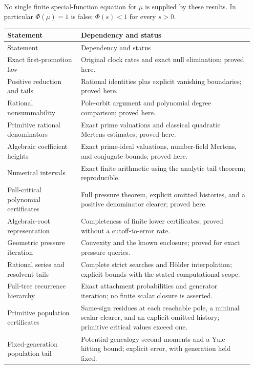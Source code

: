 \documentclass[11pt]{article}
\theoremstyle{remark}
\begin{document}
No single finite special-function equation for $\mu$ is supplied by
these results. In particular $\Phi(\mu)=1$ is false:
$\Phi(s)<1$ for every $s>0$.

{\small
\begin{longtable}{p{}p{}}
\toprule
Statement & Dependency and status\\
\midrule
\endfirsthead
\toprule
Statement & Dependency and status\\
\midrule
\endhead
Exact first-promotion law & Original clock rates and exact null elimination; proved here.\\
Positive reduction and tails & Rational identities plus explicit vanishing boundaries; proved here.\\
Rational nonsummability & Pole-orbit argument and polynomial degree comparison; proved here.\\
Primitive rational denominators & Exact prime valuations and classical quadratic Mertens estimates; proved here.\\
Algebraic coefficient heights & Exact prime-ideal valuations, number-field Mertens, and conjugate bounds; proved here.\\
Numerical intervals & Exact finite arithmetic using the analytic tail theorem; reproducible.\\
Full-critical polynomial certificates & Full pressure theorem, explicit omitted histories, and a positive denominator clearer; proved here.\\
Algebraic-root representation & Completeness of finite lower certificates; proved without a cutoff-to-error rate.\\
Geometric pressure iteration & Convexity and the known enclosure; proved for exact pressure queries.\\
Rational series and resolvent tails & Complete strict searches and H\"older interpolation; explicit bounds with the stated computational scope.\\
Full-tree recurrence hierarchy & Exact attachment probabilities and generator iteration; no finite scalar closure is asserted.\\
Primitive population certificates & Same-sign residues at each reachable pole, a minimal scalar clearer, and an explicit omitted history; primitive critical values exceed one.\\
Fixed-generation population tail & Potential-genealogy second moments and a Yule hitting bound; explicit error, with generation held fixed.\\

\end{longtable}}
\end{document}

